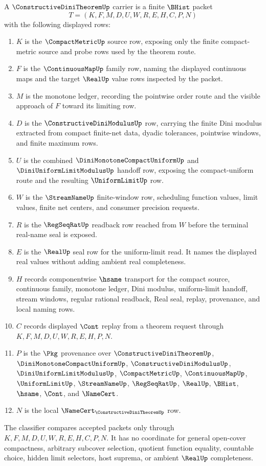 \begin{definition}
\label{def:constructive-dini-theorem-carrier}
A $\ConstructiveDiniTheoremUp$ carrier is a finite $\BHist$ packet
$$
T=(K,F,M,D,U,W,R,E,H,C,P,N)
$$
with the following displayed rows:
\begin{enumerate}
\item $K$ is the $\CompactMetricUp$ source row, exposing only the finite compact-metric source and probe rows used by the theorem route.
\item $F$ is the $\ContinuousMapUp$ family row, naming the displayed continuous maps and the target $\RealUp$ value rows inspected by the packet.
\item $M$ is the monotone ledger, recording the pointwise order route and the visible approach of $F$ toward its limiting row.
\item $D$ is the $\ConstructiveDiniModulusUp$ row, carrying the finite Dini modulus extracted from compact finite-net data, dyadic tolerances, pointwise windows, and finite maximum rows.
\item $U$ is the combined $\DiniMonotoneCompactUniformUp$ and $\DiniUniformLimitModulusUp$ handoff row, exposing the compact-uniform route and the resulting $\UniformLimitUp$ row.
\item $W$ is the $\StreamNameUp$ finite-window row, scheduling function values, limit values, finite net centers, and consumer precision requests.
\item $R$ is the $\RegSeqRatUp$ readback row reached from $W$ before the terminal real-name seal is exposed.
\item $E$ is the $\RealUp$ seal row for the uniform-limit read. It names the displayed real values without adding ambient real completeness.
\item $H$ records componentwise $\hsame$ transport for the compact source, continuous family, monotone ledger, Dini modulus, uniform-limit handoff, stream windows, regular rational readback, Real seal, replay, provenance, and local naming rows.
\item $C$ records displayed $\Cont$ replay from a theorem request through $K,F,M,D,U,W,R,E,H,P,N$.
\item $P$ is the $\Pkg$ provenance over $\ConstructiveDiniTheoremUp$, $\DiniMonotoneCompactUniformUp$, $\ConstructiveDiniModulusUp$, $\DiniUniformLimitModulusUp$, $\CompactMetricUp$, $\ContinuousMapUp$, $\UniformLimitUp$, $\StreamNameUp$, $\RegSeqRatUp$, $\RealUp$, $\BHist$, $\hsame$, $\Cont$, and $\NameCert$.
\item $N$ is the local $\NameCert_{\ConstructiveDiniTheoremUp}$ row.
\end{enumerate}
The classifier compares accepted packets only through $K,F,M,D,U,W,R,E,H,C,P,N$. It has no coordinate for general open-cover compactness, arbitrary subcover selection, quotient function equality, countable choice, hidden limit selectors, host suprema, or ambient $\RealUp$ completeness.
\end{definition}

